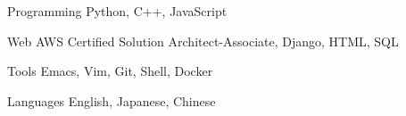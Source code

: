 


\begin{cvskills}


\cvskill
{Programming}
{Python, C++, JavaScript}


\cvskill
{Web} %
{AWS Certified Solution Architect-Associate, Django, HTML, SQL} %


\cvskill
{Tools} %
{Emacs, Vim, Git, Shell, Docker} %


\cvskill
{Languages} %
{English, Japanese, Chinese} %


\end{cvskills}